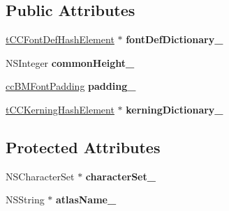 \subsection*{Public Attributes}
\begin{DoxyCompactItemize}
\item 
\hypertarget{interface_c_c_b_m_font_configuration_a2f7f908d1a5cf7dc8ef2a9021ae4e599}{\hyperlink{struct___font_def_hash_element}{t\-C\-C\-Font\-Def\-Hash\-Element} $\ast$ {\bfseries font\-Def\-Dictionary\-\_\-}}\label{interface_c_c_b_m_font_configuration_a2f7f908d1a5cf7dc8ef2a9021ae4e599}

\item 
\hypertarget{interface_c_c_b_m_font_configuration_a68539ff1edeb4d68b5639ab1d6fdd8e8}{N\-S\-Integer {\bfseries common\-Height\-\_\-}}\label{interface_c_c_b_m_font_configuration_a68539ff1edeb4d68b5639ab1d6fdd8e8}

\item 
\hypertarget{interface_c_c_b_m_font_configuration_ae90bc035dd6890296caa4bb5acc7bafc}{\hyperlink{structcc_b_m_font_padding}{cc\-B\-M\-Font\-Padding} {\bfseries padding\-\_\-}}\label{interface_c_c_b_m_font_configuration_ae90bc035dd6890296caa4bb5acc7bafc}

\item 
\hypertarget{interface_c_c_b_m_font_configuration_acc9caa4db1ed98af9acc7e630a67b816}{\hyperlink{struct___kerning_hash_element}{t\-C\-C\-Kerning\-Hash\-Element} $\ast$ {\bfseries kerning\-Dictionary\-\_\-}}\label{interface_c_c_b_m_font_configuration_acc9caa4db1ed98af9acc7e630a67b816}

\end{DoxyCompactItemize}
\subsection*{Protected Attributes}
\begin{DoxyCompactItemize}
\item 
\hypertarget{interface_c_c_b_m_font_configuration_a76615afc47b1161d1c7b8cf758d7ad66}{N\-S\-Character\-Set $\ast$ {\bfseries character\-Set\-\_\-}}\label{interface_c_c_b_m_font_configuration_a76615afc47b1161d1c7b8cf758d7ad66}

\item 
\hypertarget{interface_c_c_b_m_font_configuration_a15637f1aee3890cf2ed64f787eb1bbb4}{N\-S\-String $\ast$ {\bfseries atlas\-Name\-\_\-}}\label{interface_c_c_b_m_font_configuration_a15637f1aee3890cf2ed64f787eb1bbb4}

\end{DoxyCompactItemize}

